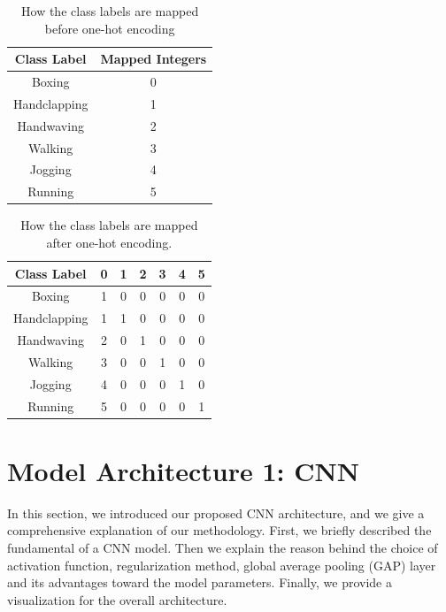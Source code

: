 \begin{table}[ht]
\caption{How the class labels are mapped before one-hot encoding}
\centering
\begin{tabular}{|c|c|}
\hline
\textbf{Class Label} & \textbf{Mapped Integers} \\ \hline
Boxing               & 0                        \\ \hline
Handclapping         & 1                        \\ \hline
Handwaving           & 2                        \\ \hline
Walking              & 3                        \\ \hline
Jogging              & 4                        \\ \hline
Running              & 5                        \\ \hline
\end{tabular}

\label{tb:onehotencoding}
\end{table}
\begin{table}[ht]
\caption{How the class labels are mapped after one-hot encoding.}

\centering
\begin{tabular}{|c|c|c|c|c|c|c|}
\hline
\textbf{Class Label} & \textbf{0} & \textbf{1} & \textbf{2} & \textbf{3} & \textbf{4} & \textbf{5} \\ \hline
Boxing               & 1          & 0          & 0          & 0          & 0          & 0          \\ \hline
Handclapping         & 1          & 1          & 0          & 0          & 0          & 0          \\ \hline
Handwaving           & 2          & 0          & 1          & 0          & 0          & 0          \\ \hline
Walking              & 3          & 0          & 0          & 1          & 0          & 0          \\ \hline
Jogging              & 4          & 0          & 0          & 0          & 1          & 0          \\ \hline
Running              & 5          & 0          & 0          & 0          & 0          & 1          \\ \hline
\end{tabular}
\label{tb:onehotencoding2}
\end{table}


\section{Model Architecture 1: CNN}
In this section, we introduced our proposed CNN architecture, and we give a comprehensive explanation of our methodology. First, we briefly described the fundamental of a CNN model. Then we explain the reason behind the choice of activation function, regularization method, global average pooling (GAP) layer and its advantages toward the model parameters. Finally, we provide a visualization for the overall architecture.  


